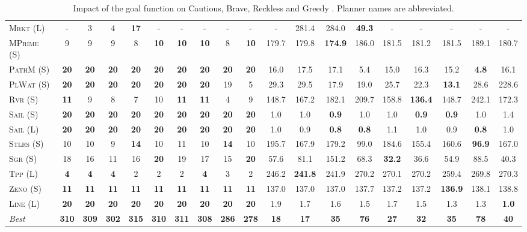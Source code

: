 \begin{table}[tb]
{\begin{tabular}{|l||ccccccccc||ccccccccc||}
\textsc{Mrkt} (L)&-&3&4&\textbf{17}&-&-&-&-&-&-&281.4&284.0&\textbf{49.3}&-&-&-&-&-\\
\textsc{MPrime} (S)&9&9&9&8&\textbf{10}&\textbf{10}&\textbf{10}&8&\textbf{10}&179.7&179.8&\textbf{174.9}&186.0&181.5&181.2&181.5&189.1&180.7\\
\textsc{PathM} (S)&\textbf{20}&\textbf{20}&\textbf{20}&\textbf{20}&\textbf{20}&\textbf{20}&\textbf{20}&\textbf{20}&\textbf{20}&16.0&17.5&17.1&5.4&15.0&16.3&15.2&\textbf{4.8}&16.1\\
\textsc{PlWat} (S)&\textbf{20}&\textbf{20}&\textbf{20}&\textbf{20}&\textbf{20}&\textbf{20}&\textbf{20}&19&5&29.3&29.5&17.9&19.0&25.7&22.3&\textbf{13.1}&28.6&228.6\\
\textsc{Rvr} (S)&\textbf{11}&9&8&7&10&\textbf{11}&\textbf{11}&4&9&148.7&167.2&182.1&209.7&158.8&\textbf{136.4}&148.7&242.1&172.3\\
\textsc{Sail} (S)&\textbf{20}&\textbf{20}&\textbf{20}&\textbf{20}&\textbf{20}&\textbf{20}&\textbf{20}&\textbf{20}&\textbf{20}&1.0&1.0&\textbf{0.9}&1.0&1.0&\textbf{0.9}&\textbf{0.9}&1.0&1.4\\
\textsc{Sail} (L)&\textbf{20}&\textbf{20}&\textbf{20}&\textbf{20}&\textbf{20}&\textbf{20}&\textbf{20}&\textbf{20}&\textbf{20}&1.0&0.9&\textbf{0.8}&\textbf{0.8}&1.1&1.0&0.9&\textbf{0.8}&1.0\\
\textsc{Stlrs} (S)&10&10&9&\textbf{14}&10&11&10&\textbf{14}&10&195.7&167.9&179.2&99.0&184.6&155.4&160.6&\textbf{96.9}&167.0\\
\textsc{Sgr} (S)&18&16&11&16&\textbf{20}&19&17&15&\textbf{20}&57.6&81.1&151.2&68.3&\textbf{32.2}&36.6&54.9&88.5&40.3\\
\textsc{Tpp} (L)&\textbf{4}&\textbf{4}&\textbf{4}&2&2&2&\textbf{4}&3&2&246.2&\textbf{241.8}&241.9&270.2&270.1&270.2&259.4&269.8&270.3\\
\textsc{Zeno} (S)&\textbf{11}&\textbf{11}&\textbf{11}&\textbf{11}&\textbf{11}&\textbf{11}&\textbf{11}&\textbf{11}&\textbf{11}&137.0&137.0&137.0&137.7&137.2&137.2&\textbf{136.9}&138.1&138.8\\
\textsc{Line} (L)&\textbf{20}&\textbf{20}&\textbf{20}&\textbf{20}&\textbf{20}&\textbf{20}&\textbf{20}&\textbf{20}&\textbf{20}&1.9&1.7&1.6&1.5&1.7&1.5&1.3&1.3&\textbf{1.0}
\\\hline
\textit{Best}&\textbf{310}&\textbf{309}&\textbf{302}&\textbf{315}&\textbf{310}&\textbf{311}&\textbf{308}&\textbf{286}&\textbf{278}&\textbf{18}&\textbf{17}&\textbf{35}&\textbf{76}&\textbf{27}&\textbf{32}&\textbf{35}&\textbf{78}&\textbf{40}\\\hline

        \end{tabular}}
        \caption{Impact of the goal function on Cautious, Brave, Reckless and Greedy \pattyd. Planner names are abbreviated.}
        \label{tab:abl-gf}
        \end{table}
        
